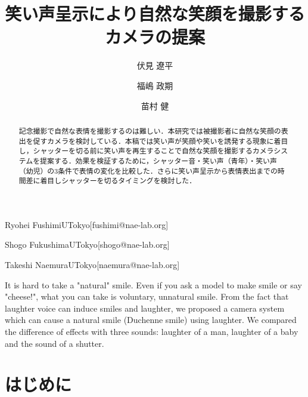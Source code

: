 \documentclass[submit,techreq]{ec2014}
\begin{document}
\title{笑い声呈示により自然な笑顔を撮影するカメラの提案}


\author{伏見 遼平}{Ryohei Fushimi}{UTokyo}[fushimi@nae-lab.org]
\author{福嶋 政期}{Shogo Fukushima}{UTokyo}[shogo@nae-lab.org]
\author{苗村 健}{Takeshi Naemura}{UTokyo}[naemura@nae-lab.org]

\begin{abstract}
記念撮影で自然な表情を撮影するのは難しい．本研究では被撮影者に自然な笑顔の表出を促すカメラを検討している．本稿では笑い声が笑顔や笑いを誘発する現象に着目し，シャッターを切る前に笑い声を再生することで自然な笑顔を撮影するカメラシステムを提案する．効果を検証するために，シャッター音・笑い声（青年）・笑い声（幼児）の3条件で表情の変化を比較した．さらに笑い声呈示から表情表出までの時間差に着目しシャッターを切るタイミングを検討した．
\end{abstract}


\begin{eabstract}
It is hard to take a "natural" smile. Even if you ask a model to make smile or say "cheese!", what you can take is voluntary, unnatural smile. From the fact that laughter voice can induce smiles and laughter, we proposed a camera system which can cause a natural smile (Duchenne smile) using laughter. We compared the difference of effects with three sounds: laughter of a man, laughter of a baby and the sound of a shutter.
\end{eabstract}


\maketitle

\section{はじめに}
\end{document}
